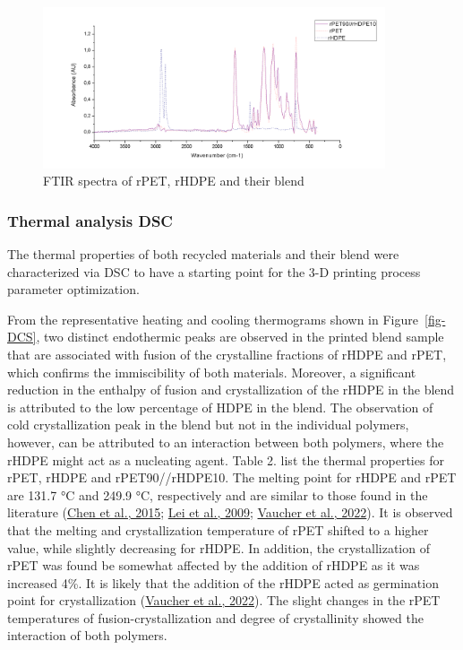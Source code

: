 \documentclass[
  12pt,
]{article}
\begin{document}
\begin{figure}

{\centering \includegraphics[width=0.9\textwidth,height=\textheight]{figures/Figure_7_FTIR.png}

}

\caption{\label{fig-FTIR}FTIR spectra of rPET, rHDPE and their blend}

\end{figure}

\hypertarget{thermal-analysis-dsc}{%
\subsubsection{Thermal analysis DSC}\label{thermal-analysis-dsc}}

The thermal properties of both recycled materials and their blend were
characterized via DSC to have a starting point for the 3-D printing
process parameter optimization.

From the representative heating and cooling thermograms shown in
Figure~\ref{fig-DCS}, two distinct endothermic peaks are observed in the
printed blend sample that are associated with fusion of the crystalline
fractions of rHDPE and rPET, which confirms the immiscibility of both
materials. Moreover, a significant reduction in the enthalpy of fusion
and crystallization of the rHDPE in the blend is attributed to the low
percentage of HDPE in the blend. The observation of cold crystallization
peak in the blend but not in the individual polymers, however, can be
attributed to an interaction between both polymers, where the rHDPE
might act as a nucleating agent. Table 2. list the thermal properties
for rPET, rHDPE and rPET90//rHDPE10. The melting point for rHDPE and
rPET are 131.7 °C and 249.9 °C, respectively and are similar to those
found in the literature (\protect\hyperlink{ref-chen2015}{Chen et al.,
2015}; \protect\hyperlink{ref-lei2009}{Lei et al., 2009};
\protect\hyperlink{ref-vaucher2022}{Vaucher et al., 2022}). It is
observed that the melting and crystallization temperature of rPET
shifted to a higher value, while slightly decreasing for rHDPE. In
addition, the crystallization of rPET was found be somewhat affected by
the addition of rHDPE as it was increased 4\%. It is likely that the
addition of the rHDPE acted as germination point for crystallization
(\protect\hyperlink{ref-vaucher2022}{Vaucher et al., 2022}). The slight
changes in the rPET temperatures of fusion-crystallization and degree of
crystallinity showed the interaction of both polymers.
\end{document}
